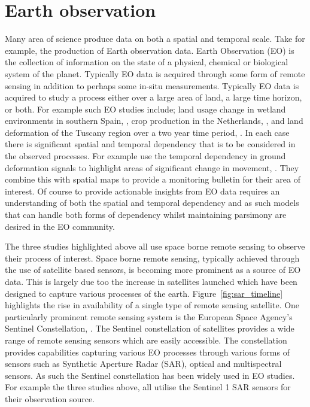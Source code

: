 \section{Earth observation\label{sec:eo}}
Many area of science produce data on both a spatial and temporal scale. Take for example, the production of Earth observation data. Earth Observation (EO) is the collection of information on the state of a physical, chemical or biological system of the planet. Typically EO data is acquired through some form of remote sensing in addition to perhaps some in-situ measurements. Typically EO data is acquired to study a process either over a large area of land, a large time horizon, or both. For example such EO studies include; land usage change in wetland environments in southern Spain, \citep{muro_short-term_2016}, crop production in the Netherlands, \citep{khabbazan_crop_2019}, and land deformation of the Tuscany region over a two year time period, \citep{raspini_continuous_2018}. In each case there is significant spatial and temporal dependency that is to be considered in the observed processes. For example \citeauthor{raspini_continuous_2018} use the temporal dependency in ground deformation signals to highlight areas of significant change in movement, \citep{raspini_continuous_2018}. They combine this with spatial maps to provide a monitoring bulletin for their area of interest. Of course to provide actionable insights from EO data requires an understanding of both the spatial and temporal dependency and as such models that can handle both forms of dependency whilst maintaining parsimony are desired in the EO community. 

The three studies highlighted above all use space borne remote sensing to observe their process of interest.  Space borne remote sensing, typically achieved through the use of satellite based sensors, is becoming more prominent as a source of EO data. This is largely due too the increase in satellites launched which have been designed to capture various processes of the earth. Figure~\ref{fig:sar_timeline} highlights the rise in availability of a single type of remote sensing satellite. One particularly prominent remote sensing system is the European Space Agency's Sentinel Constellation, \cite{aschbacher_european_2012}. The Sentinel constellation of satellites provides a wide range of remote sensing sensors which are easily accessible. The constellation provides capabilities capturing various EO processes through various forms of sensors such as Synthetic Aperture Radar (SAR), optical and multispectral sensors. As such the Sentinel constellation has been widely used in EO studies. For example the three studies above, \citep{muro_short-term_2016, khabbazan_crop_2019, raspini_continuous_2018}  all utilise the Sentinel 1 SAR sensors for their observation source. 

